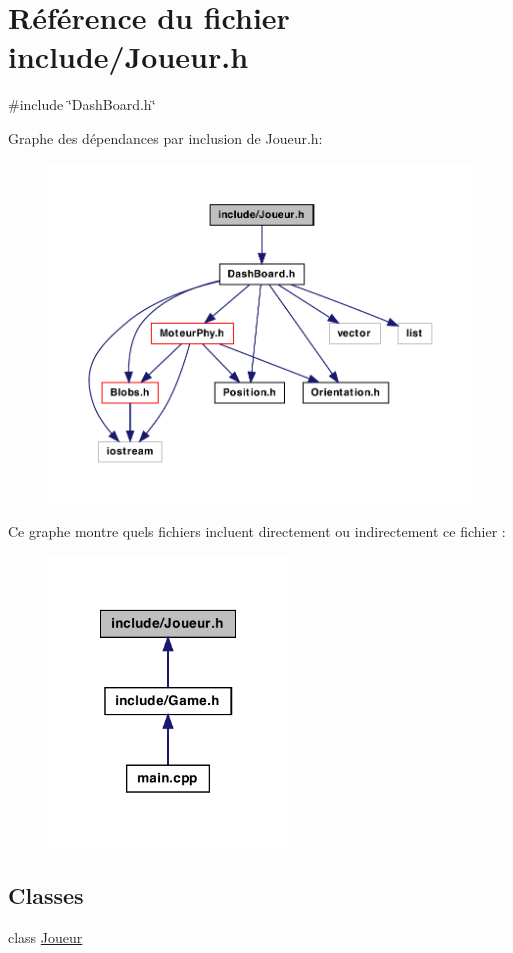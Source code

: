 \hypertarget{a00029}{
\section{Référence du fichier include/Joueur.h}
\label{a00029}
}
{\ttfamily \#include \char`\"{}DashBoard.h\char`\"{}}\par
Graphe des dépendances par inclusion de Joueur.h:
\nopagebreak
\begin{figure}[H]
\begin{center}
\leavevmode
\includegraphics[width=400pt]{a00060}
\end{center}
\end{figure}
Ce graphe montre quels fichiers incluent directement ou indirectement ce fichier :
\nopagebreak
\begin{figure}[H]
\begin{center}
\leavevmode
\includegraphics[width=180pt]{a00061}
\end{center}
\end{figure}
\subsection*{Classes}
\begin{DoxyCompactItemize}
\item 
class \hyperlink{a00012}{Joueur}
\end{DoxyCompactItemize}
